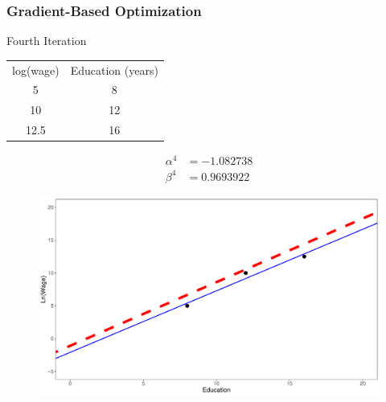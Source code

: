 \documentclass[
  shownotes,
  xcolor={svgnames},
  hyperref={colorlinks,citecolor=DarkBlue,linkcolor=DarkRed,urlcolor=DarkBlue}
  , aspectratio=169]{beamer}
\begin{document}
\begin{frame}[fragile]
\frametitle{Gradient-Based Optimization}
\tiny
Fourth Iteration
\begin{table}[]
\begin{tabular}{cc}
log(wage) & Education (years) \\
5         & 8                                                         \\
10        & 12                                                          \\
12.5      & 16                                                          \\
\end{tabular}
\end{table}



\begin{align}
\alpha^4&=  -1.082738 \nonumber \\
\beta^4 &= 0.9693922 \nonumber
\end{align}


        \begin{figure}[H] \centering
            \captionsetup{justification=centering}  
            \includegraphics[scale=0.15]{figures/fig_1_5.pdf}
    \end{figure}



\end{frame}
\end{document}
